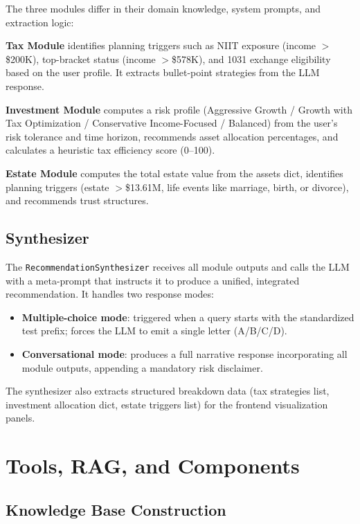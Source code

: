 \documentclass[sigplan,screen]{acmart}
\begin{document}
The three modules differ in their domain knowledge, system prompts, and extraction logic:

\textbf{Tax Module} identifies planning triggers such as NIIT exposure (income $>$\$200K), top-bracket status (income $>$\$578K), and 1031 exchange eligibility based on the user profile. It extracts bullet-point strategies from the LLM response.

\textbf{Investment Module} computes a risk profile (Aggressive Growth / Growth with Tax Optimization / Conservative Income-Focused / Balanced) from the user's risk tolerance and time horizon, recommends asset allocation percentages, and calculates a heuristic tax efficiency score (0--100).

\textbf{Estate Module} computes the total estate value from the assets dict, identifies planning triggers (estate $>$\$13.61M, life events like marriage, birth, or divorce), and recommends trust structures.

\subsection{Synthesizer}

The \texttt{RecommendationSynthesizer} receives all module outputs and calls the LLM with a meta-prompt that instructs it to produce a unified, integrated recommendation.
It handles two response modes:
\begin{itemize}
  \item \textbf{Multiple-choice mode}: triggered when a query starts with the standardized test prefix; forces the LLM to emit a single letter (A/B/C/D).
  \item \textbf{Conversational mode}: produces a full narrative response incorporating all module outputs, appending a mandatory risk disclaimer.
\end{itemize}
The synthesizer also extracts structured breakdown data (tax strategies list, investment allocation dict, estate triggers list) for the frontend visualization panels.

\section{Tools, RAG, and Components}

\subsection{Knowledge Base Construction}
\end{document}

